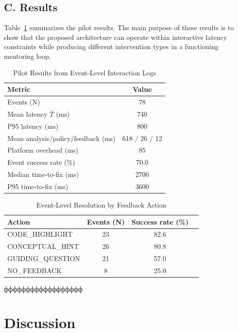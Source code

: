 \documentclass[conference]{IEEEtran}
\begin{document}
\subsection*{C. Results}

Table~\ref{tab:results} summarizes the pilot results. The main purpose of these results is to show that the proposed architecture can operate within interactive latency constraints while producing different intervention types in a functioning mentoring loop.

\begin{table}[t]
\centering
\caption{Pilot Results from Event-Level Interaction Logs}
\label{tab:results}
\renewcommand{\arraystretch}{1.15}
\begin{tabular}{lc}
\hline
\textbf{Metric} & \textbf{Value} \\
\hline
Events (N) & 78 \\
Mean latency $\bar{T}$ (ms) & 740 \\
P95 latency (ms) & 800 \\
Mean analysis/policy/feedback (ms) & 618 / 26 / 12 \\
Platform overhead (ms) & 85 \\
Event success rate (\%) & 70.0 \\
Median time-to-fix (ms) & 2700 \\
P95 time-to-fix (ms) & 3600 \\
\hline
\end{tabular}
\end{table}

\begin{table}[t]
\centering
\caption{Event-Level Resolution by Feedback Action}
\label{tab:action_success}
\renewcommand{\arraystretch}{1.15}
\begin{tabular}{lccc}
\hline
\textbf{Action} & \textbf{Events (N)} & \textbf{Success rate (\%)} \\
\hline
CODE\_HIGHLIGHT   & 23 & 82.6 \\
CONCEPTUAL\_HINT  & 26 & 80.8 \\
GUIDING\_QUESTION & 21 & 57.0 \\
NO\_FEEDBACK      & 8  & 25.0 \\
\hline
\end{tabular}
\end{table}фффффффффффффффффф

\section{Discussion}
\end{document}
